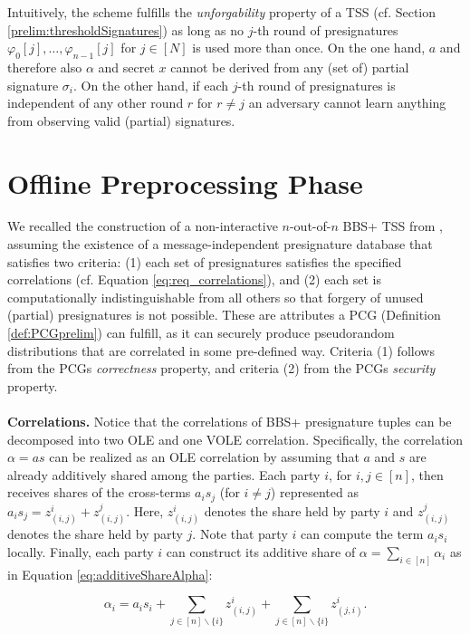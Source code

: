 Intuitively, the scheme fulfills the \textit{unforgability} property of a TSS (cf. Section \ref{prelim:thresholdSignatures}) as long as no $j$-th round of presignatures $\varphi_{0}[j], \ldots, \varphi_{n-1}[j]$ for $j \in [N]$  is used more than once. On the one hand, $a$ and therefore also $\alpha$ and secret $x$ cannot be derived from any (set of) partial signature $\sigma_i$. On the other hand, if each $j$-th round of presignatures is independent of any other round $r$ for $r \neq j$ an adversary cannot learn anything from observing valid (partial) signatures.

\section{Offline Preprocessing Phase}
We recalled the construction of a non-interactive $n$-out-of-$n$ BBS+ TSS from \cite{faust2023non}, assuming the existence of a message-independent presignature database that satisfies two criteria: (1) each set of presignatures satisfies the specified correlations (cf. Equation \ref{eq:req_correlations}), and (2) each set is computationally indistinguishable from all others so that forgery of unused (partial) presignatures is not possible. These are attributes a PCG (Definition \ref{def:PCGprelim}) can fulfill, as it can securely produce pseudorandom distributions that are correlated in some pre-defined way. Criteria (1) follows from the PCGs \textit{correctness} property, and criteria (2) from the PCGs \textit{security} property.
\\\\
\textbf{Correlations.} Notice that the correlations of BBS+ presignature tuples can be decomposed into two OLE and one VOLE correlation. Specifically, the correlation $\alpha = as$ can be realized as an OLE correlation by assuming that $a$ and $s$ are already additively shared among the parties. Each party $i$, for $i, j \in [n]$, then receives shares of the cross-terms $a_is_j$ (for $i \neq j$) represented as  $a_is_j = z_{(i,j)}^i+z_{(i,j)}^j$. Here, $z_{(i,j)}^i$ denotes the share held by party $i$ and $z_{(i,j)}^j$ denotes the share held by party $j$. Note that party $i$ can compute the term $a_is_i$ locally. Finally, each party $i$ can construct its additive share of $\alpha = \sum_{i\in [n]}\alpha_i$ as in Equation \ref{eq:additiveShareAlpha}:

\begin{equation}
  \alpha_i=a_is_i + \sum_{j \in [n]\backslash \{i\}}{z_{(i,j)}^i} + \sum_{j \in [n]\backslash \{i\}}z_{(j,i)}^i.
  \label{eq:additiveShareAlpha}
\end{equation}


